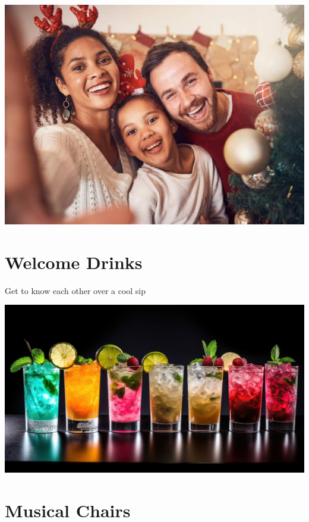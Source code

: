 \documentclass[makeidx, 11pt, oneside, onecolumn, openright, final, svgnames, dvipsnames, extrafontsizes]{memoir}
\begin{document}
\begin{center}
\includegraphics[scale=1]{funp.jpeg}
\end{center}



\chapter{Welcome Drinks}
\thispagestyle{empty}
\begin{center}
Get to know each other over a cool sip
\end{center}
\begin{center}
\includegraphics[scale=1]{drinks3.jpeg}
\end{center}



\chapter{Musical Chairs}
\thispagestyle{empty}
\end{document}
